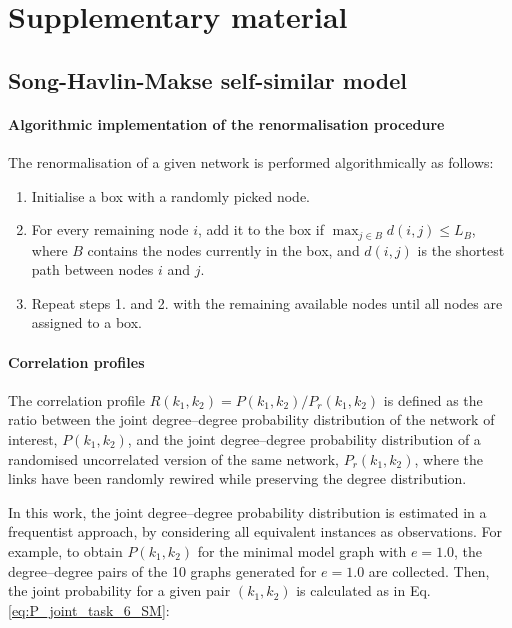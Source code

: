 \chapter{Supplementary material}


\section{Song-Havlin-Makse self-similar model}
\label{sec:SHM_SM}
 
\subsubsection*{Algorithmic implementation of the renormalisation procedure}
The renormalisation of a given network is performed algorithmically as follows:

\begin{enumerate}
	\item Initialise a box with a randomly picked node.
	\item For every remaining node $i$, add it to the box if $\max_{j\in B} d(i,j) \leq L_B$, where $B$ contains the nodes currently in the box, and $d(i,j)$ is the shortest path between nodes $i$ and $j$.
	\item Repeat steps 1. and 2. with the remaining available nodes until all nodes are assigned to a box.
\end{enumerate}

\subsubsection*{Correlation profiles}

The correlation profile $R(k_1, k_2) = P(k_1, k_2) / P_r(k_1, k_2)$ is defined as the ratio between the joint degree--degree probability distribution of the network of interest, $P(k_1, k_2)$, and the joint degree--degree probability distribution of a randomised uncorrelated version of the same network, $P_r(k_1, k_2)$, where the links have been randomly rewired while preserving the degree distribution. 

In this work, the joint degree--degree probability distribution is estimated in a frequentist approach, by considering all equivalent instances as observations. For example, to obtain $P(k_1, k_2)$ for the minimal model graph with $e=1.0$, the degree--degree pairs of the 10 graphs generated for $e=1.0$ are collected. Then, the joint probability for a given pair $(k_1, k_2)$ is calculated as in Eq. \ref{eq:P_joint_task_6_SM}:

